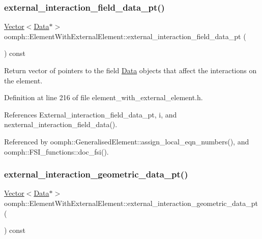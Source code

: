 \subsubsection{\texorpdfstring{external\+\_\+interaction\+\_\+field\+\_\+data\+\_\+pt()}{external\_interaction\_field\_data\_pt()}}
{\footnotesize\ttfamily \hyperlink{classoomph_1_1Vector}{Vector}$<$\hyperlink{classoomph_1_1Data}{Data}$\ast$$>$ oomph\+::\+Element\+With\+External\+Element\+::external\+\_\+interaction\+\_\+field\+\_\+data\+\_\+pt (\begin{DoxyParamCaption}{ }\end{DoxyParamCaption}) const\hspace{0.3cm}{\ttfamily [inline]}}



Return vector of pointers to the field \hyperlink{classoomph_1_1Data}{Data} objects that affect the interactions on the element. 



Definition at line 216 of file element\+\_\+with\+\_\+external\+\_\+element.\+h.



References External\+\_\+interaction\+\_\+field\+\_\+data\+\_\+pt, i, and nexternal\+\_\+interaction\+\_\+field\+\_\+data().



Referenced by oomph\+::\+Generalised\+Element\+::assign\+\_\+local\+\_\+eqn\+\_\+numbers(), and oomph\+::\+F\+S\+I\+\_\+functions\+::doc\+\_\+fsi().

\mbox{\label{classoomph_1_1ElementWithExternalElement_ad9632a0a9391964020177d3507261545}} 
\subsubsection{\texorpdfstring{external\+\_\+interaction\+\_\+geometric\+\_\+data\+\_\+pt()}{external\_interaction\_geometric\_data\_pt()}}
{\footnotesize\ttfamily \hyperlink{classoomph_1_1Vector}{Vector}$<$\hyperlink{classoomph_1_1Data}{Data}$\ast$$>$ oomph\+::\+Element\+With\+External\+Element\+::external\+\_\+interaction\+\_\+geometric\+\_\+data\+\_\+pt (\begin{DoxyParamCaption}{ }\end{DoxyParamCaption}) const\hspace{0.3cm}{\ttfamily [inline]}}



